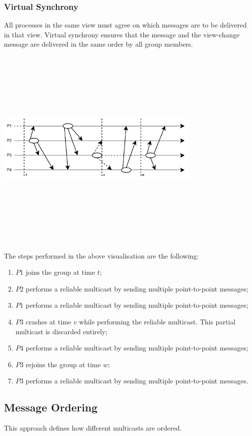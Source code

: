 \documentclass{article}
\begin{document}
\subsubsection{Virtual Synchrony}
All processes in the same view must agree on which messages are to be delivered in that view. Virtual synchrony ensures that the message and the view-change message are delivered in the same order by all group members.
\begin{center}
	\includegraphics[width=10cm, height=10cm, keepaspectratio]{assets/virtual-synchrony.pdf}
\end{center}
The steps performed in the above visualisation are the following:
\begin{enumerate}
	\item $P1$ joins the group at time $t$;
	\item $P2$ performs a reliable multicast by sending multiple point-to-point messages;
	\item $P1$ performs a reliable multicast by sending multiple point-to-point messages;
	\item $P3$ crashes at time $v$ while performing the reliable multicast. This partial multicast is discarded entirely;
	\item $P4$ performs a reliable multicast by sending multiple point-to-point messages;
	\item $P3$ rejoins the group at time $w$;
	\item $P3$ performs a reliable multicast by sending multiple point-to-point messages.
\end{enumerate}

\subsection{Message Ordering}
This approach defines how different multicasts are ordered.
\end{document}
